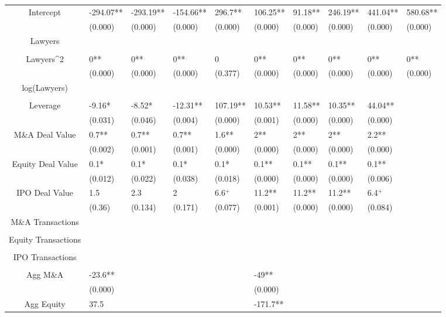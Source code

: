 \documentclass{article}
\begin{document}
\begin{table}[H]
\begin{tabular}{|clllllllll|}
Intercept & -294.07** & -293.19** & -154.66** & 296.7** & 106.25** & 91.18** & 246.19** & 441.04** & 580.68** \\
   & (0.000) & (0.000) & (0.000) & (0.000) & (0.000) & (0.000) & (0.000) & (0.000) & (0.000) \\
  Lawyers &  &  &  &  &  &  &  &  &  \\
   &  &  &  &  &  &  &  &  &  \\
  Lawyers^2 & 0** & 0** & 0** & 0 & 0** & 0** & 0** & 0** & 0** \\
   & (0.000) & (0.000) & (0.000) & (0.377) & (0.000) & (0.000) & (0.000) & (0.000) & (0.000) \\
  log(Lawyers) &  &  &  &  &  &  &  &  &  \\
   &  &  &  &  &  &  &  &  &  \\
  Leverage & -9.16* & -8.52* & -12.31** & 107.19** & 10.53** & 11.58** & 10.35** & 44.04** &  \\
   & (0.031) & (0.046) & (0.004) & (0.000) & (0.001) & (0.000) & (0.000) & (0.000) &  \\
  M\&A Deal Value & 0.7** & 0.7** & 0.7** & 1.6** & 2** & 2** & 2** & 2.2** &  \\
   & (0.002) & (0.001) & (0.001) & (0.000) & (0.000) & (0.000) & (0.000) & (0.000) &  \\
  Equity Deal Value & 0.1* & 0.1* & 0.1* & 0.1* & 0.1** & 0.1** & 0.1** & 0.1** &  \\
   & (0.012) & (0.022) & (0.038) & (0.018) & (0.000) & (0.000) & (0.000) & (0.006) &  \\
  IPO Deal Value & 1.5 & 2.3 & 2 & 6.6$^{+}$ & 11.2** & 11.2** & 11.2** & 6.4$^{+}$ &  \\
   & (0.36) & (0.134) & (0.171) & (0.077) & (0.001) & (0.000) & (0.000) & (0.084) &  \\
  M\&A Transactions &  &  &  &  &  &  &  &  &  \\
   &  &  &  &  &  &  &  &  &  \\
  Equity Transactions &  &  &  &  &  &  &  &  &  \\
   &  &  &  &  &  &  &  &  &  \\
  IPO Transactions &  &  &  &  &  &  &  &  &  \\
   &  &  &  &  &  &  &  &  &  \\
  Agg M\&A & -23.6** &  &  &  & -49** &  &  &  &  \\
   & (0.000) &  &  &  & (0.000) &  &  &  &  \\
  Agg Equity & 37.5 &  &  &  & -171.7** &  &  &  &  \\

\end{tabular}
\end{table}
\end{document}
